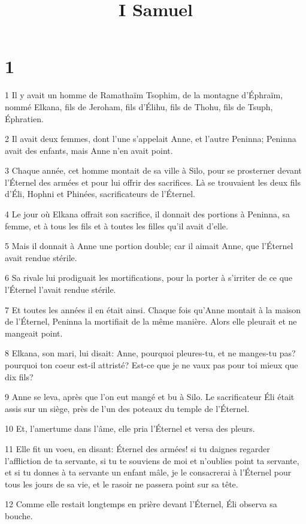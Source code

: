 

\title{I Samuel}


\chapter{1}

\par 1 Il y avait un homme de Ramathaïm Tsophim, de la montagne d'Éphraïm, nommé Elkana, fils de Jeroham, fils d'Élihu, fils de Thohu, fils de Tsuph, Éphratien.
\par 2 Il avait deux femmes, dont l'une s'appelait Anne, et l'autre Peninna; Peninna avait des enfants, mais Anne n'en avait point.
\par 3 Chaque année, cet homme montait de sa ville à Silo, pour se prosterner devant l'Éternel des armées et pour lui offrir des sacrifices. Là se trouvaient les deux fils d'Éli, Hophni et Phinées, sacrificateurs de l'Éternel.
\par 4 Le jour où Elkana offrait son sacrifice, il donnait des portions à Peninna, sa femme, et à tous les fils et à toutes les filles qu'il avait d'elle.
\par 5 Mais il donnait à Anne une portion double; car il aimait Anne, que l'Éternel avait rendue stérile.
\par 6 Sa rivale lui prodiguait les mortifications, pour la porter à s'irriter de ce que l'Éternel l'avait rendue stérile.
\par 7 Et toutes les années il en était ainsi. Chaque fois qu'Anne montait à la maison de l'Éternel, Peninna la mortifiait de la même manière. Alors elle pleurait et ne mangeait point.
\par 8 Elkana, son mari, lui disait: Anne, pourquoi pleures-tu, et ne manges-tu pas? pourquoi ton coeur est-il attristé? Est-ce que je ne vaux pas pour toi mieux que dix fils?
\par 9 Anne se leva, après que l'on eut mangé et bu à Silo. Le sacrificateur Éli était assis sur un siège, près de l'un des poteaux du temple de l'Éternel.
\par 10 Et, l'amertume dans l'âme, elle pria l'Éternel et versa des pleurs.
\par 11 Elle fit un voeu, en disant: Éternel des armées! si tu daignes regarder l'affliction de ta servante, si tu te souviens de moi et n'oublies point ta servante, et si tu donnes à ta servante un enfant mâle, je le consacrerai à l'Éternel pour tous les jours de sa vie, et le rasoir ne passera point sur sa tête.
\par 12 Comme elle restait longtemps en prière devant l'Éternel, Éli observa sa bouche.
